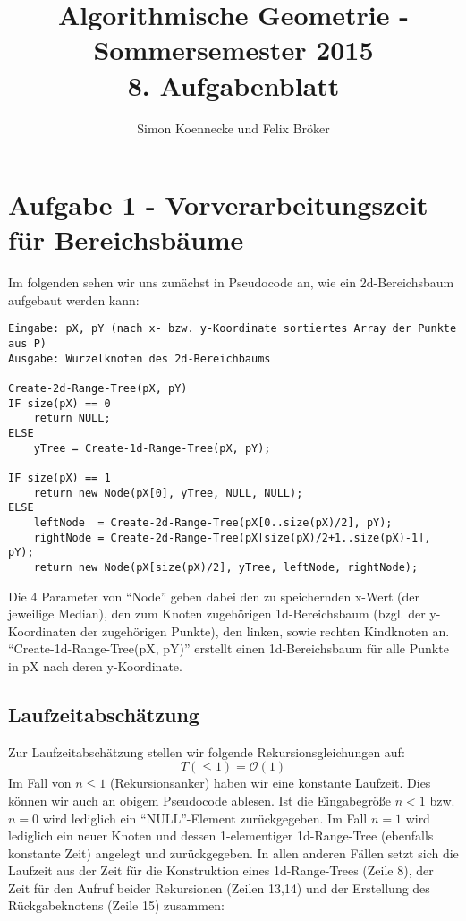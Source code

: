 \documentclass[a4paper]{article}
\begin{document}
\title{Algorithmische Geometrie - Sommersemester 2015\\
       8. Aufgabenblatt }
\author{Simon Koennecke und Felix Bröker}
\date{}
\maketitle

\section*{Aufgabe 1 - Vorverarbeitungszeit für Bereichsbäume}

Im folgenden sehen wir uns zunächst in Pseudocode an, 
wie ein 2d-Bereichsbaum aufgebaut werden kann:

\begin{lstlisting}
Eingabe: pX, pY (nach x- bzw. y-Koordinate sortiertes Array der Punkte aus P)
Ausgabe: Wurzelknoten des 2d-Bereichbaums

Create-2d-Range-Tree(pX, pY)
IF size(pX) == 0
	return NULL;
ELSE
	yTree = Create-1d-Range-Tree(pX, pY);

IF size(pX) == 1
	return new Node(pX[0], yTree, NULL, NULL);
ELSE
	leftNode  = Create-2d-Range-Tree(pX[0..size(pX)/2], pY);
	rightNode = Create-2d-Range-Tree(pX[size(pX)/2+1..size(pX)-1], pY);
	return new Node(pX[size(pX)/2], yTree, leftNode, rightNode);
\end{lstlisting}

Die 4 Parameter von "`Node"' geben dabei den zu speichernden x-Wert (der jeweilige Median), 
den zum Knoten zugehörigen 1d-Bereichsbaum (bzgl. der y-Koordinaten der zugehörigen Punkte),
den linken, sowie rechten Kindknoten an. "`Create-1d-Range-Tree(pX, pY)"' erstellt einen 1d-Bereichsbaum
für alle Punkte in pX nach deren y-Koordinate. 

\subsection*{Laufzeitabschätzung}
Zur Laufzeitabschätzung stellen wir folgende Rekursionsgleichungen auf:
$$T(\leq 1) = \mathcal{O}(1)$$
Im Fall von $n \leq 1$ (Rekursionsanker) haben wir eine konstante Laufzeit.
Dies können wir auch an obigem Pseudocode ablesen. Ist die Eingabegröße $ n < 1$ bzw. $n = 0$
wird lediglich ein "`NULL"'-Element zurückgegeben. Im Fall $n = 1$ wird lediglich ein neuer Knoten
und dessen 1-elementiger 1d-Range-Tree (ebenfalls konstante Zeit) angelegt und zurückgegeben. 
In allen anderen Fällen setzt sich die Laufzeit aus der Zeit für die Konstruktion eines 1d-Range-Trees
(Zeile 8), der Zeit für den Aufruf beider Rekursionen (Zeilen 13,14) und der Erstellung des Rückgabeknotens (Zeile 15) zusammen:
\end{document}
